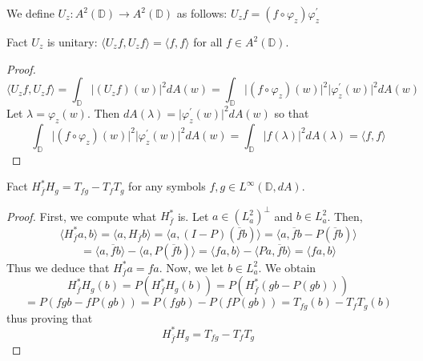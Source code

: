 \documentclass{beamer}
\begin{document}
\begin{frame}
We define $U_z: A^2(\mathbb{D}) \rightarrow A^2(\mathbb{D})$ as follows: \(U_zf = (f \circ \varphi_z)\varphi_z^\prime\)
\begin{block}{Fact}
$U_z$ is unitary: $\langle U_z f, U_z f \rangle = \langle f, f \rangle$ for all $f \in A^2(\mathbb{D})$.
\end{block}
\begin{proof}
\[
\langle U_z f, U_z f \rangle = \int_\mathbb{D} \vert (U_zf)(w) \vert^2 dA(w) = \int_\mathbb{D} \vert (f \circ \varphi_z)(w) \vert^2 \vert \varphi_z^\prime(w)\vert^2 dA(w)
\] Let $\lambda = \varphi_z(w)$. Then $dA(\lambda) = \vert \varphi_z^\prime(w) \vert^2 dA(w)$ so that
\[
\int_\mathbb{D} \vert (f \circ \varphi_z)(w) \vert^2 \vert \varphi_z^\prime(w)\vert^2 dA(w) = \int_\mathbb{D} \vert f(\lambda) \vert^2 dA(\lambda) = \langle f, f \rangle
\]
\end{proof}
\end{frame}

\begin{frame}
\begin{block}{Fact}
$H_{\overline{f}}^* H_g = T_{fg} - T_f T_g$ for any symbols $f,g \in L^\infty(\mathbb{D},dA)$. 
\end{block}
\begin{proof}
First, we compute what $H_{\overline{f}}^*$ is. Let $a \in (L_a^2)^\perp$ and $b \in L_a^2$. Then,
\[
\langle H_{\overline{f}}^*a, b \rangle = \langle a, H_{\overline{f}} b \rangle = \langle a, (I-P)(\overline{f}b) \rangle = \langle a, \overline{f}b - P(\overline{f}b) \rangle 
\]
\[
= \langle a, \overline{f}b \rangle - \langle a,  P(\overline{f}b)\rangle = \langle fa, b \rangle - \langle Pa, \overline{f}b \rangle = \langle fa, b \rangle
\] Thus we deduce that $H_{\overline{f}}^*a = fa$. Now, we let $b \in L_a^2$. We obtain
\[
H_{\overline{f}}^* H_g(b) = P(H_{\overline{f}}^* H_g(b)) = P(H_{\overline{f}}^*(gb - P(gb)))  
\]
\[
= P(fgb - fP(gb)) = P(fgb) - P(fP(gb)) = T_{fg}(b) - T_f T_g(b)
\] thus proving that 
\[
H_{\overline{f}}^* H_g = T_{fg} - T_f T_g
\]
\end{proof}
\end{frame}
\end{document}
